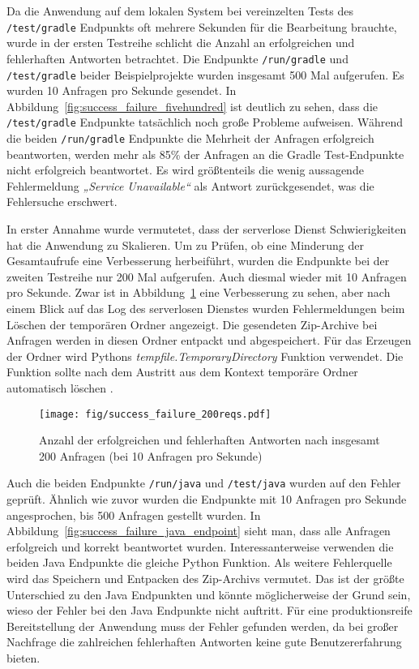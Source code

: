 Da die Anwendung auf dem lokalen System bei vereinzelten Tests des \texttt{/test/gradle} Endpunkts oft
mehrere Sekunden für die Bearbeitung brauchte, wurde in der ersten
Testreihe schlicht die Anzahl an erfolgreichen und fehlerhaften Antworten betrachtet.
Die Endpunkte \texttt{/run/gradle} und \texttt{/test/gradle} beider Beispielprojekte
wurden insgesamt 500 Mal aufgerufen. Es wurden 10 Anfragen pro Sekunde gesendet.
In Abbildung~\ref{fig:success_failure_fivehundred} ist deutlich zu sehen,
dass die \texttt{/test/gradle} Endpunkte tatsächlich noch große Probleme
aufweisen. Während die beiden \texttt{/run/gradle} Endpunkte die Mehrheit der Anfragen erfolgreich
beantworten, werden mehr als 85\% der Anfragen an die Gradle Test-Endpunkte nicht
erfolgreich beantwortet. Es wird größtenteils die wenig aussagende Fehlermeldung \emph{„Service Unavailable“}
als Antwort zurückgesendet, was die Fehlersuche erschwert.

In erster Annahme wurde vermutetet, dass der serverlose Dienst Schwierigkeiten hat die
Anwendung zu Skalieren. Um zu Prüfen, ob eine Minderung der Gesamtaufrufe eine
Verbesserung herbeiführt, wurden die Endpunkte bei der zweiten Testreihe nur 200 Mal aufgerufen.
Auch diesmal wieder mit 10 Anfragen pro Sekunde.
Zwar ist in Abbildung~\ref{fig:success_failure_twohundred} eine Verbesserung zu sehen,
aber nach einem Blick auf das Log des serverlosen Dienstes wurden Fehlermeldungen beim Löschen
der temporären Ordner angezeigt. Die gesendeten Zip-Archive bei Anfragen werden
in diesen Ordner entpackt und abgespeichert. Für das Erzeugen der Ordner wird
Pythons \emph{tempfile.TemporaryDirectory} Funktion verwendet.
Die Funktion sollte nach dem Austritt aus dem Kontext temporäre Ordner
automatisch löschen \cite{PythonTempfile}.

\begin{figure}
  \centering
  \texttt{[image: fig/success\_failure\_200reqs.pdf]}
  \caption{Anzahl der erfolgreichen und fehlerhaften Antworten nach insgesamt 200 Anfragen (bei 10 Anfragen pro Sekunde)}
  \label{fig:success_failure_twohundred}
\end{figure}

Auch die beiden Endpunkte \texttt{/run/java} und \texttt{/test/java} wurden auf den Fehler geprüft.
Ähnlich wie zuvor wurden die Endpunkte mit 10 Anfragen pro Sekunde angesprochen, bis
500 Anfragen gestellt wurden. In Abbildung~\ref{fig:success_failure_java_endpoint} sieht
man, dass alle Anfragen erfolgreich
und korrekt beantwortet wurden. Interessanterweise verwenden die beiden Java Endpunkte
die gleiche Python Funktion. Als weitere Fehlerquelle wird das Speichern
und Entpacken des Zip-Archivs vermutet. Das ist der größte Unterschied zu den Java Endpunkten und könnte
möglicherweise der Grund sein, wieso der Fehler bei den Java Endpunkte nicht auftritt.
Für eine produktionsreife Bereitstellung der Anwendung
muss der Fehler gefunden werden, da bei großer Nachfrage die zahlreichen fehlerhaften Antworten keine
gute Benutzererfahrung bieten.

